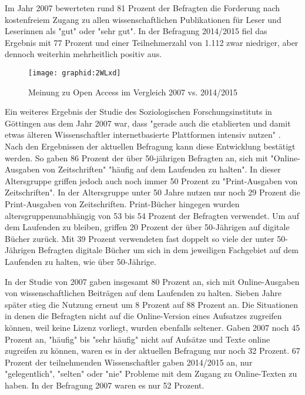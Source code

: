 Im Jahr 2007 bewerteten rund 81 Prozent der Befragten die Forderung nach kostenfreiem Zugang zu allen wissenschaftlichen Publikationen für Leser und Leserinnen als "gut" oder "sehr gut". In der Befragung 2014/2015 fiel das Ergebnis mit 77 Prozent und einer Teilnehmerzahl von 1.112 zwar niedriger, aber dennoch weiterhin mehrheitlich positiv aus.

\begin{figure}[h!]
\texttt{[image: graphid:2WLxd]}
\caption{Meinung zu Open Access im Vergleich 2007 vs. 2014/2015}
\end{figure}

Ein weiteres Ergebnis der Studie des Soziologischen Forschungsinstituts in Göttingen aus dem Jahr 2007 war, dass "gerade auch die etablierten und damit etwas älteren Wissenschaftler internetbasierte Plattformen intensiv nutzen" \cite{Hanekop_2007}. Nach den Ergebnissen der aktuellen Befragung kann diese Entwicklung bestätigt werden. So gaben 86 Prozent der über 50-jährigen Befragten an, sich mit "Online-Ausgaben von Zeitschriften" "häufig auf dem Laufenden zu halten". In dieser Altersgruppe griffen jedoch auch noch immer 50 Prozent zu "Print-Ausgaben von Zeitschriften". In der Altersgruppe unter 50 Jahre nutzen nur noch 29 Prozent die Print-Ausgaben von Zeitschriften. Print-Bücher hingegen wurden altersgruppenunabhängig von 53 bis 54 Prozent der Befragten verwendet. Um auf dem Laufenden zu bleiben, griffen 20 Prozent der über 50-Jährigen auf digitale Bücher zurück. Mit 39 Prozent verwendeten fast doppelt so viele der unter 50-Jährigen Befragten digitale Bücher um sich in dem jeweiligen Fachgebiet auf dem Laufenden zu halten, wie über 50-Jährige.

In der Studie von 2007 gaben insgesamt 80 Prozent an, sich mit Online-Ausgaben von wissenschaftlichen Beiträgen auf dem Laufenden zu halten. Sieben Jahre später stieg die Nutzung erneut um 8 Prozent auf 88 Prozent an. Die Situationen in denen die Befragten nicht auf die Online-Version eines Aufsatzes zugreifen können, weil keine Lizenz vorliegt, wurden ebenfalls seltener. Gaben 2007 noch 45 Prozent an, "häufig" bis "sehr häufig" nicht auf Aufsätze und Texte online zugreifen zu können, waren es in der aktuellen Befragung nur noch 32 Prozent. 67 Prozent der teilnehmenden Wissenschaftler gaben 2014/2015 an, nur "gelegentlich", "selten" oder "nie" Probleme mit dem Zugang zu Online-Texten zu haben. In der Befragung 2007 waren es nur 52 Prozent.

